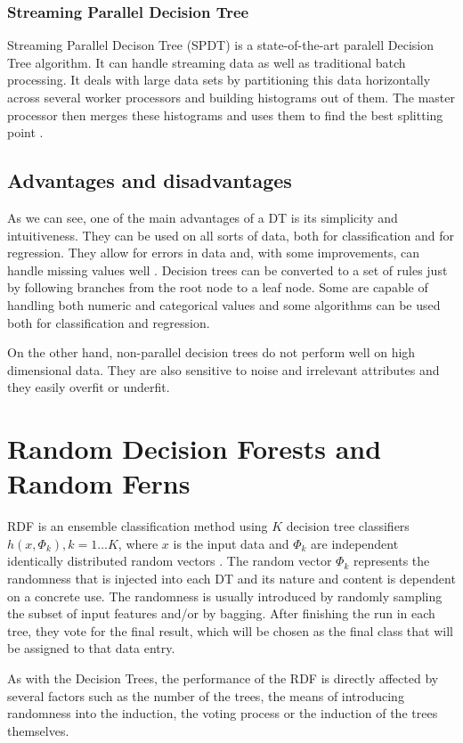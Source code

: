 \documentclass[thesis=B,english]{FITthesis}[2012/10/20]
\begin{document}
		\subsection{Streaming Parallel Decision Tree}
		Streaming Parallel Decison Tree (SPDT) is a state-of-the-art paralell Decision Tree algorithm. It can handle streaming data as well as traditional batch processing. It deals with large data sets by partitioning this data horizontally across several worker processors and building histograms out of them. The master processor then merges these histograms and uses them to find the best splitting point \cite{ben2010streamings}. 

		\section{Advantages and disadvantages}
		As we can see, one of the main advantages of a DT is its simplicity and intuitiveness. They can be used on all sorts of data, both for classification and for regression. They allow for errors in data and, with some improvements, can handle missing values well \cite{DMWithDecisionTrees,CMP07}. Decision trees can be converted to a set of rules just by following branches from the root node to a leaf node. Some are capable of handling both numeric and categorical values and some algorithms can be used both for classification and regression.

		On the other hand, non-parallel decision trees do not perform well on high dimensional data. They are also sensitive to noise and irrelevant attributes and they easily overfit or underfit.
\chapter{Random Decision Forests and Random Ferns}
\label{chap:RDF}
	RDF is an ensemble classification method using \(K\) decision tree classifiers \({h(x, \Phi_k), k = 1\dots K} \), where \(x\) is the input data and \({\Phi_k}\) are independent identically distributed random vectors \cite{SELECTION_OF_DT}. The random vector \(\Phi_k\) represents the randomness that is injected into each DT and its nature and content is dependent on a concrete use. The randomness is usually introduced by randomly sampling the subset of input features and/or by bagging. After finishing the run in each tree, they vote for the final result, which will be chosen as the final class that will be assigned to that data entry.

	As with the Decision Trees, the performance of the RDF is directly affected by several factors such as the number of the trees, the means of introducing randomness into the induction, the voting process or the induction of the trees themselves.
\end{document}
